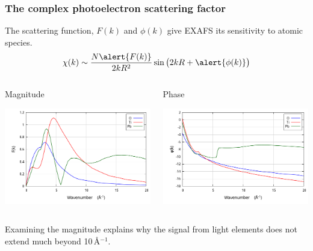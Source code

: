 \documentclass[10pt, xcolor=x11names, compress]{beamer}
\begin{document}
\begin{frame}
  \frametitle{The complex photoelectron scattering factor}
  The scattering function, $F(k)$ and $\phi(k)$ give EXAFS its
  sensitivity to atomic species.
  \begin{equation}
    \chi(k) \sim \frac{N\alert{F(k)}}{2kR^2}\sin\big(2kR+\alert{\phi(k)}\big)
    \notag
  \end{equation}
  \begin{columns}
    \begin{column}{0.5\linewidth}
      \begin{center}
        Magnitude

        \includegraphics[width=\linewidth]{images/f_eff.png}
      \end{center}
    \end{column}
    \begin{column}{0.5\linewidth}
      \begin{center}
        Phase

        \includegraphics[width=\linewidth]{images/phi_eff.png}
      \end{center}
    \end{column}
  \end{columns}
  Examining the magnitude explains why the signal from light elements
  does not extend much beyond 10\,\AA$^{-1}$.
\end{frame}
\end{document}
